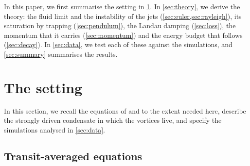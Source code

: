 \documentclass{jpp}
\begin{document}
In this paper, we first summarise the setting in \cref{sec:setting}. In \cref{sec:theory}, we derive the theory: the fluid limit and the instability of the jets (\cref{sec:euler,sec:rayleigh}), its saturation by trapping (\cref{sec:pendulum}), the Landau damping (\cref{sec:loss}), the momentum that it carries (\cref{sec:momentum}) and the energy budget that follows (\cref{sec:decay}). In \cref{sec:data}, we test each of these against the simulations, and \cref{sec:summary} summarises the results.

\section{The setting}\label{sec:setting}

In this section, we recall the equations of \citet{KennedyPlunkLetter} and \citet{KennedyPlunkManuscript} to the extent needed here, describe the strongly driven condensate in which the vortices live, and specify the simulations analysed in \cref{sec:data}.

\subsection{Transit-averaged equations}\label{sec:equations}
\end{document}
